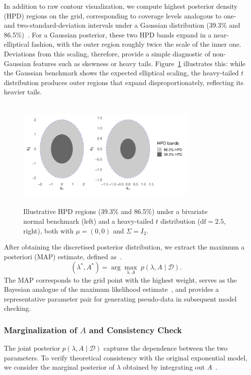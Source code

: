 In addition to raw contour visualization, we compute highest posterior density (HPD) regions on the grid, corresponding to coverage levels analogous to one- and two-standard-deviation intervals under a Gaussian distribution (39.3\% and 86.5\%)~\cite{kocev2021modeling}. For a Gaussian posterior, these two HPD bands expand in a near-elliptical fashion, with the outer region roughly twice the scale of the inner one. Deviations from this scaling, therefore, provide a simple diagnostic of non-Gaussian features such as skewness or heavy tails. Figure~\ref{fig:hpd-example} illustrates this: while the Gaussian benchmark shows the expected elliptical scaling, the heavy-tailed $t$ distribution produces outer regions that expand disproportionately, reflecting its heavier tails.
\begin{figure}[H]
    \centering
    \includegraphics[height=5.5cm, width=0.8\textwidth]{images/hpd_normal_vs_student-t.pdf}
    \caption{{\small Illustrative HPD regions (39.3\% and 86.5\%) under a bivariate normal benchmark (left) and a heavy-tailed $t$ distribution ($\text{df}=2.5$, right), both with $\mu=(0,0)$ and $\Sigma=I_2$.}}
    \label{fig:hpd-example}
\end{figure}
After obtaining the discretised posterior distribution, we extract the maximum a posteriori (MAP) estimate, defined as~\cite{gelman1995bayesian}.
\begin{equation}
    (\lambda^*, A^*) = \arg\max_{\lambda,A} \; p(\lambda,A \mid \mathcal D).
\end{equation}
The MAP corresponds to the grid point with the highest weight, serves as the Bayesian analogue of the maximum likelihood estimate~\cite{robert2007bayesian, gelman1995bayesian}, and provides a representative parameter pair for generating pseudo-data in subsequent model checking.



\subsubsection{Marginalization of \texorpdfstring{$A$}{A} and Consistency Check}
\label{边际化章节}
The joint posterior $p(\lambda, A \mid \mathcal D)$ captures the dependence between the two parameters. To verify theoretical consistency with the original exponential model, we consider the marginal posterior of $\lambda$ obtained by integrating out $A$~\cite{gelman1995bayesian}.   

